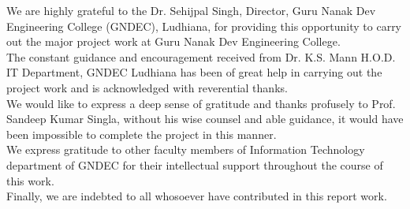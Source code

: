 \label{•} \begin{Large}
\end{Large}
\vskip 0.1in %



\noindent We are highly grateful to the Dr. Sehijpal Singh, Director, Guru Nanak Dev Engineering College (GNDEC), Ludhiana, for providing this opportunity to carry out the major project work at Guru Nanak Dev Engineering College.\\

\noindent The constant guidance and encouragement received from Dr. K.S. Mann H.O.D. IT Department, GNDEC Ludhiana has been of great help in carrying out the project work and is acknowledged with reverential thanks.\\

\noindent We would like to express a deep sense of gratitude and thanks profusely to Prof. Sandeep Kumar Singla, without his wise counsel and able guidance, it would have been impossible to complete the project in this manner.\\

\noindent We express gratitude to other faculty members of Information Technology department of GNDEC for their intellectual support throughout the course of this work.\\

\noindent Finally, we are indebted to all whosoever have contributed in this report work.



\vskip 0.4in
\noindent 
\textbf{\studentName}

